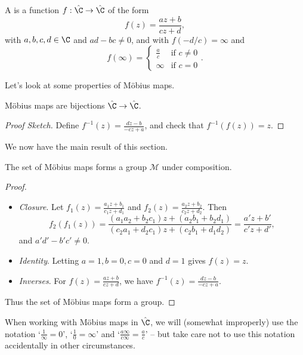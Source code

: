 \documentclass[a4paper]{scrartcl}
\begin{document}
\begin{definition}
	A  is a function $f : \hat{\C} \rightarrow \hat{\C}$ of the form
	$$
	f(z) = \frac{az + b}{cz + d},
	$$
	with $a, b, c, d \in \C$ and $ad - bc \neq 0$, and with $f(-d/c) = \infty$ and 
	$$
	f(\infty) = \begin{cases}
	   \frac{a}{c} &\mbox{if } c \neq 0 \\
	   \infty &\mbox{if } c = 0
	   \end{cases}.
	$$
\end{definition}

Let's look at some properties of Möbius maps.

\begin{proposition}
	Möbius maps are bijections $\hat{\C} \rightarrow \hat{\C}$.
\end{proposition}
\begin{proof}[Proof Sketch]
	Define $f^{-1}(z) = \frac{dz - b}{-cz + a}$, and check that $f^{-1}(f(z)) = z$.
\end{proof}

We now have the main result of this section.

\begin{theorem}
	The set of Möbius maps forms a group $\mathcal{M}$ under composition.
\end{theorem}
\begin{proof}$ $
	\begin{itemize}
		\item \emph{Closure}. Let $f_1(z) = \frac{a_1 z + b_1}{c_1 z + d_1}$ and $f_2(z) = \frac{a_2 z + b_2}{c_2 z + d_2}$. Then
		$$
		f_2(f_1(z)) = \frac{(a_1 a_2 + b_2 c_1)z + (a_2 b_1 + b_2 d_1)}{(c_2 a_1 + d_2 c_1)z + (c_2 b_1+ d_1 d_2)} = \frac{a' z + b'}{c' z + d'},
		$$
		and $a' d' - b' c' \neq 0$.
		\item \emph{Identity}. Letting $a = 1, b = 0, c = 0$ and $d = 1$ gives $f(z) = z$.
		\item \emph{Inverses}. For $f(z) = \frac{az + b}{cz + d}$, we have $f^{-1}(z) = \frac{dz - b}{-cz + a}$. 
	\end{itemize}
	Thus the set of Möbius maps form a group.
\end{proof}

\begin{remark}
	When working with Möbius maps in $\hat{\C}$, we will (somewhat improperly) use the notation `$\frac{1}{\infty} = 0$', `$\frac{1}{0} = \infty$' and `$\frac{a\infty}{c \infty} = \frac{a}{c}$' -- but take care not to use this notation accidentally in other circumstances.
\end{remark}
\end{document}
